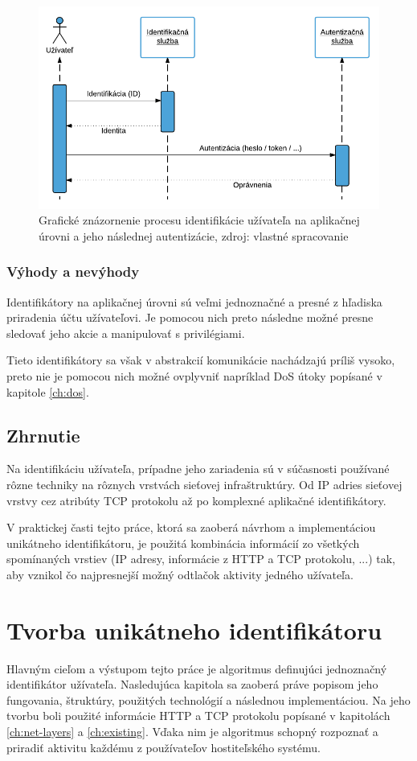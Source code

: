\documentclass[
  digital, %
  table,   %
  lof,     %
  nolot,   %
  nocover
]{fithesis3}
\begin{document}
\begin{figure}[h]
  \centering
    \includegraphics[width=.99\textwidth]{images/tech-app.png}
  \caption{Grafické znázornenie procesu identifikácie užívateľa na aplikačnej
  úrovni a jeho následnej autentizácie, zdroj: vlastné spracovanie}
  \label{fig:tech-app}
\end{figure}

\subsection{Výhody a nevýhody}
Identifikátory na aplikačnej úrovni sú veľmi jednoznačné a presné z hľadiska
priradenia účtu užívateľovi. Je pomocou nich preto následne možné presne
sledovať jeho akcie a manipulovať s privilégiami.

Tieto identifikátory sa však v abstrakcií komunikácie nachádzajú príliš vysoko,
preto nie je pomocou nich možné ovplyvniť napríklad DoS útoky popísané v
kapitole \ref{ch:dos}.

\section{Zhrnutie}
Na identifikáciu užívateľa, prípadne jeho zariadenia sú v súčasnosti
používané rôzne techniky na rôznych vrstvách sieťovej infraštruktúry. Od IP
adries sieťovej vrstvy cez atribúty TCP protokolu až po komplexné aplikačné
identifikátory. 

V praktickej časti tejto práce, ktorá sa zaoberá návrhom a implementáciou
unikátneho identifikátoru, je použitá kombinácia informácií zo všetkých
spomínaných vrstiev (IP adresy, informácie z HTTP a TCP protokolu, ...) tak,
aby vznikol čo najpresnejší možný odtlačok aktivity jedného užívateľa.

\chapter{Tvorba unikátneho identifikátoru}
\label{ch:footprint}
Hlavným cieľom a výstupom tejto práce je algoritmus definujúci jednoznačný
identifikátor užívateľa. Nasledujúca kapitola sa zaoberá práve popisom jeho
fungovania, štruktúry, použitých technológií a následnou implementáciou. Na
jeho tvorbu boli použité informácie HTTP a TCP protokolu popísané v
kapitolách \ref{ch:net-layers} a \ref{ch:existing}. Vďaka nim je algoritmus
schopný rozpoznať a priradiť aktivitu každému z používateľov hostiteľského
systému.
\end{document}
